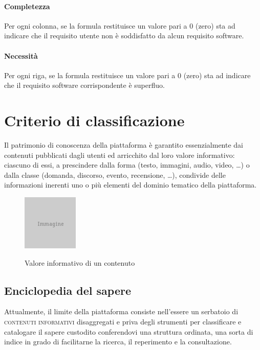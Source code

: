 \paragraph{Completezza} Per ogni colonna, se la formula restituisce un valore pari a 0 (zero) sta ad indicare che il requisito utente non è soddisfatto da alcun requisito software.

\paragraph{Necessità} Per ogni riga, se la formula restituisce un valore pari a 0 (zero) sta ad indicare che il requisito software corrispondente è superfluo.

\section{Criterio di classificazione}
\label{sec:tesi:stage:criterio-classificazione}
Il patrimonio di conoscenza della piattaforma è garantito essenzialmente dai contenuti pubblicati dagli utenti ed arricchito dal loro valore informativo: ciascuno di essi, a prescindere dalla forma (testo, immagini, audio, video, \ldots) o dalla classe (domanda, discorso, evento, recensione, \ldots), condivide delle informazioni inerenti uno o più elementi del dominio tematico della piattaforma.

\begin{figure}[ht]
\begin{center}
 \includegraphics{placeholder.png}
 \label{fig:tesi:stage:classificazione:serbatoio-contenuti}
 \caption{Valore informativo di un contenuto}
\end{center}
\end{figure}

\subsection{Enciclopedia del sapere}
\label{sec:tesi:stage:criterio-classificazione:enciclopedia}
Attualmente, il limite della piattaforma consiste nell'essere un serbatoio di \textsc{contenuti informativi} disaggregati e priva degli strumenti per classificare e catalogare il sapere custodito conferendovi una struttura ordinata, una sorta di indice in grado di facilitarne la ricerca, il reperimento e la consultazione.

